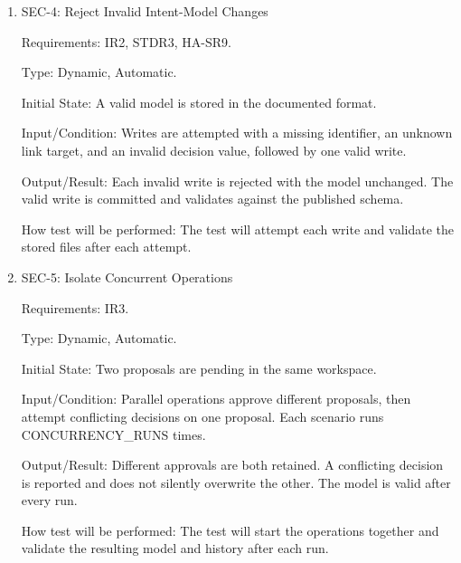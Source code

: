 \documentclass[12pt, titlepage]{article}
\begin{document}
\begin{enumerate}
Input/Condition: Separate runs terminate the process during the intent-model write
and fail a handoff-file write while applying the approval and release.

Output/Result: The decision, intent-model update, and released handoff are all
applied or all left unchanged. No partial model or handoff is visible. A failed
handoff write leaves the previous model and handoff unchanged, and the failure
is reported.

How test will be performed: The test will inject each failure, restart after the
termination case, validate and compare the model, and inspect the handoff files,
recorded decision, release status, and reported error.

\item{SEC-4: Reject Invalid Intent-Model Changes\\}

Requirements: IR2, STDR3, HA-SR9.

Type: Dynamic, Automatic.

Initial State: A valid model is stored in the documented format.

Input/Condition: Writes are attempted with a missing identifier, an unknown link
target, and an invalid decision value, followed by one valid write.

Output/Result: Each invalid write is rejected with the model unchanged. The valid
write is committed and validates against the published schema.

How test will be performed: The test will attempt each write and validate the
stored files after each attempt.

\item{SEC-5: Isolate Concurrent Operations\\}

Requirements: IR3.

Type: Dynamic, Automatic.

Initial State: Two proposals are pending in the same workspace.

Input/Condition: Parallel operations approve different proposals, then attempt
conflicting decisions on one proposal. Each scenario runs CONCURRENCY\_RUNS times.

Output/Result: Different approvals are both retained. A conflicting decision is
reported and does not silently overwrite the other. The model is valid after every
run.

How test will be performed: The test will start the operations together and validate
the resulting model and history after each run.


\end{enumerate}
\end{document}
